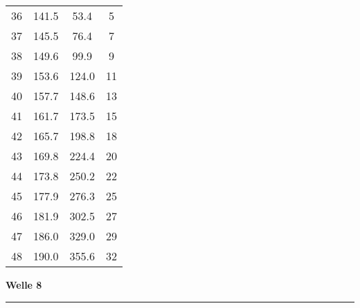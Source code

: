 \documentclass[10pt, a4paper]{article}
\begin{document}
\begin{center}
\begin{tabular}{c|c|c|c}
		36 & 141.5 & 53.4 & 5 \\
		37 & 145.5 & 76.4 & 7 \\
		38 & 149.6 & 99.9 & 9 \\
		39 & 153.6 & 124.0 & 11 \\
		40 & 157.7 & 148.6 & 13 \\
		41 & 161.7 & 173.5 & 15 \\
		42 & 165.7 & 198.8 & 18 \\
		43 & 169.8 & 224.4 & 20 \\
		44 & 173.8 & 250.2 & 22 \\
		45 & 177.9 & 276.3 & 25 \\
		46 & 181.9 & 302.5 & 27 \\
		47 & 186.0 & 329.0 & 29 \\
		48 & 190.0 & 355.6 & 32 \\
	\end{tabular}
\end{center}
\newpage
\centerline{{\bf Welle 8} }
\rule{1.0\textwidth}{0.5mm}
\end{document}
